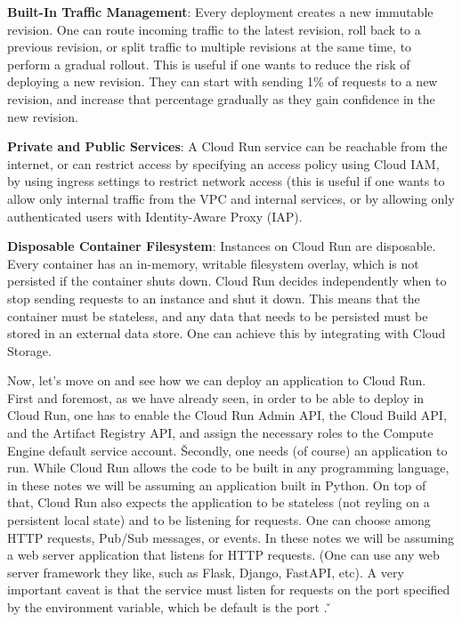 \item \textbf{Built-In Traffic Management}: Every deployment creates a new immutable revision. One can route
incoming traffic to the latest revision, roll back to a previous revision, or split traffic to multiple revisions at
the same time, to perform a gradual rollout. This is useful if one wants to reduce the risk of deploying a new
revision. They can start with sending 1\% of requests to a new revision, and increase that percentage gradually as
they gain confidence in the new revision.

\item \textbf{Private and Public Services}: A Cloud Run service can be reachable from the internet, or can restrict
access by specifying an access policy using Cloud IAM, by using ingress settings to restrict network access (this is
useful if one wants to allow only internal traffic from the VPC and internal services, or by allowing only
authenticated users with Identity-Aware Proxy (IAP).

\item \textbf{Disposable Container Filesystem}: Instances on Cloud Run are disposable. Every container has an
in-memory, writable filesystem overlay, which is not persisted if the container shuts down. Cloud Run decides
independently when to stop sending requests to an instance and shut it down. This means that the container must be
stateless, and any data that needs to be persisted must be stored in an external data store. One can achieve this by
integrating with Cloud Storage.
\eit

Now, let's move on and see how we can deploy an application to Cloud Run. First and foremost, as we have already
seen, in order to be able to deploy in Cloud Run, one has to enable the Cloud Run Admin API, the Cloud Build API,
and the Artifact Registry API, and assign the necessary roles to the Compute Engine default service account. \v

Secondly, one needs (of course) an application to run. While Cloud Run allows the code to be built in any
programming language, in these notes we will be assuming an application built in Python. On top of that, Cloud Run
also expects the application to be stateless (not reyling on a persistent local state) and to be listening for
requests. One can choose among HTTP requests, Pub/Sub messages, or events. In these notes we will be assuming a web
server application that listens for HTTP requests. (One can use any web server framework they like, such as Flask,
Django, FastAPI, etc). A very important caveat is that the service must listen for requests on the port specified by
the  environment variable, which be default is the port . \v

